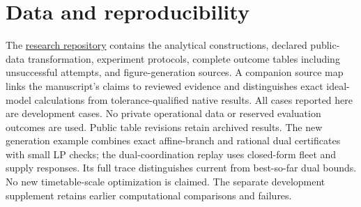 \documentclass[11pt]{article}
\let\originalsection\section
\renewcommand{\section}{\FloatBarrier\originalsection}
\begin{document}
\section*{Data and reproducibility}
The \href{https://github.com/ndandnd/egg}{research repository} contains the analytical constructions, declared public-data transformation, experiment protocols, complete outcome tables including unsuccessful attempts, and figure-generation sources. A companion source map links the manuscript's claims to reviewed evidence and distinguishes exact ideal-model calculations from tolerance-qualified native results. All cases reported here are development cases. No private operational data or reserved evaluation outcomes are used. Public table revisions retain archived results. The new generation example combines exact affine-branch and rational dual certificates with small LP checks; the dual-coordination replay uses closed-form fleet and supply responses. Its full trace distinguishes current from best-so-far dual bounds. No new timetable-scale optimization is claimed. The separate development supplement retains earlier computational comparisons and failures.

\appendix

\FloatBarrier


\end{document}
